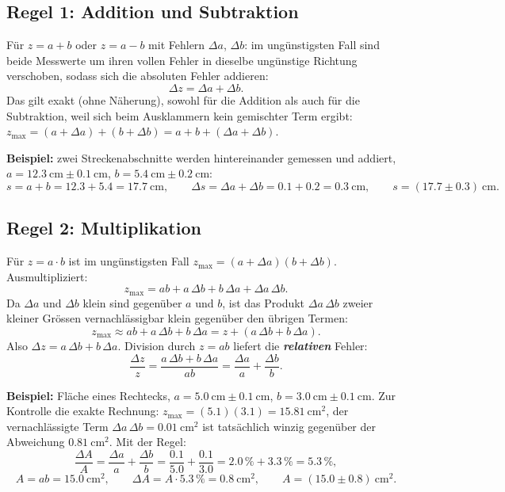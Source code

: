 \documentclass[11pt,a4paper]{article}
\begin{document}
\subsection{Regel 1: Addition und Subtraktion}
Für $z=a+b$ oder $z=a-b$ mit Fehlern $\Delta a$, $\Delta b$: im ungünstigsten Fall sind beide Messwerte um ihren vollen Fehler in dieselbe ungünstige Richtung verschoben, sodass sich die absoluten Fehler addieren:
\[
  \Delta z = \Delta a + \Delta b.
\]
Das gilt exakt (ohne Näherung), sowohl für die Addition als auch für die Subtraktion, weil sich beim Ausklammern kein gemischter Term ergibt: $z_{\max}=(a+\Delta a)+(b+\Delta b) = a+b+(\Delta a+\Delta b)$.

\textbf{Beispiel:} zwei Streckenabschnitte werden hintereinander gemessen und addiert, $a=12.3\ \mathrm{cm}\pm 0.1\ \mathrm{cm}$, $b=5.4\ \mathrm{cm}\pm 0.2\ \mathrm{cm}$:
\[
  s = a+b = 12.3+5.4 = 17.7\ \mathrm{cm}, \qquad \Delta s = \Delta a+\Delta b = 0.1+0.2 = 0.3\ \mathrm{cm}, \qquad s=(17.7\pm 0.3)\ \mathrm{cm}.
\]

\subsection{Regel 2: Multiplikation}
Für $z=a\cdot b$ ist im ungünstigsten Fall $z_{\max}=(a+\Delta a)(b+\Delta b)$. Ausmultipliziert:
\[
  z_{\max} = ab + a\,\Delta b + b\,\Delta a + \Delta a\,\Delta b.
\]
Da $\Delta a$ und $\Delta b$ klein sind gegenüber $a$ und $b$, ist das Produkt $\Delta a\,\Delta b$ zweier kleiner Grössen vernachlässigbar klein gegenüber den übrigen Termen:
\[
  z_{\max} \approx ab + a\,\Delta b + b\,\Delta a = z + (a\,\Delta b+b\,\Delta a).
\]
Also $\Delta z = a\,\Delta b+b\,\Delta a$. Division durch $z=ab$ liefert die \textbf{\emph{relativen}} Fehler:
\[
  \frac{\Delta z}{z} = \frac{a\,\Delta b+b\,\Delta a}{ab} = \frac{\Delta a}{a}+\frac{\Delta b}{b}.
\]

\textbf{Beispiel:} Fläche eines Rechtecks, $a=5.0\ \mathrm{cm}\pm 0.1\ \mathrm{cm}$, $b=3.0\ \mathrm{cm}\pm 0.1\ \mathrm{cm}$. Zur Kontrolle die exakte Rechnung: $z_{\max}=(5.1)(3.1)=15.81\ \mathrm{cm^2}$, der vernachlässigte Term $\Delta a\,\Delta b=0.01\ \mathrm{cm^2}$ ist tatsächlich winzig gegenüber der Abweichung $0.81\ \mathrm{cm^2}$. Mit der Regel:
\[
  \frac{\Delta A}{A} = \frac{\Delta a}{a}+\frac{\Delta b}{b} = \frac{0.1}{5.0}+\frac{0.1}{3.0} = 2.0\,\%+3.3\,\% = 5.3\,\%,
\]
\[
  A = ab = 15.0\ \mathrm{cm^2}, \qquad \Delta A = A\cdot 5.3\,\% = 0.8\ \mathrm{cm^2}, \qquad A=(15.0\pm 0.8)\ \mathrm{cm^2}.
\]
\end{document}
